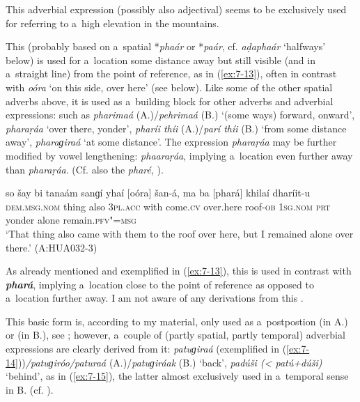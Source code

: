  This adverbial expression (possibly also adjectival) seems to be exclusively used for referring to a~high elevation in the mountains.


 This   (probably based on a~spatial
 *\textit{phaár} or *\textit{paár}, cf. \textit{aḍaphaár} `halfways' below) is used
for a~location some distance away but still visible (and in a~straight line) from the point of
reference, as in (\ref{ex:7-13}), often in contrast with \textit{oóra} `on this side, over here'
(see below). Like some of the other spatial adverbs above, it is used as a~building block for other
adverbs and adverbial expressions: such as \textit{pharimaá} (A.)/\textit{pehrimaá} (B.)
`(some ways) forward, onward', \textit{pharaṛáa} `over there, yonder', \textit{pharíi
  thíi} (A.)/\textit{parí thíi} (B.) `from some distance away', \textit{pharaɡiraá}
`at some distance'. The  expression \textit{pharaṛáa} may be further modified by vowel
lengthening: \textit{phaaraṛáa}, implying a~location even further away than
\textit{pharaṛáa}. (Cf. also the  \textit{pharé}, ).

\begin{exe}
\ex
\label{ex:7-13}
\gll so šay bi tanaám sanɡí yhaí [oóra] šan-á, ma ba [phará] khilaí dharíit-u \\
\textsc{dem.msg.nom} thing also \textsc{3pl.acc} with come.\textsc{cv} over.here roof-\textsc{ob} \textsc{1sg.nom} \textsc{prt} yonder alone remain.\textsc{pfv"=msg}\\
\glt `That thing also came with them to the roof over here, but I remained alone over there.' (A:HUA032-3)
\end{exe}

 As already mentioned and exemplified in (\ref{ex:7-13}), this   is used in contrast with \textbf{\textit{phará}}, implying a~location close to the point of reference as opposed to a~location further away. I am not aware of any derivations from this . 

 This basic form is, according to my material, only used as a~postpostion (in A.) or  (in B.), see ; however, a~couple of (partly spatial, partly temporal) adverbial expressions are clearly derived from it: \textit{patuɡiraá} (exemplified in (\ref{ex:7-14}))\textit{/patuɡiróo/paturaá} (A.)/\textit{patuɡiráak} (B.) `back', \textit{padúši ({\textless} patú+dúši)} `behind', as in (\ref{ex:7-15}), the latter almost exclusively used in a~temporal sense in B. (cf. ).

